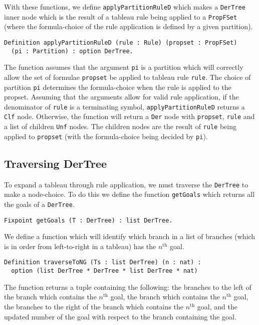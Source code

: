 \documentclass{llncs}
\newcommand{\comment}[1]{}
\begin{document}
With these functions, we define \verb+applyPartitionRuleD+ which makes a
\verb+DerTree+ inner node which is the result of a tableau rule being applied
to a \verb+PropFSet+ (where the formula-choice of the rule application is
defined by a given partition).
%
\comment{
\begin{verbatim}
Definition applyPartitionRuleD (rule : Rule) (propset : PropFSet)
  (pi : Partition) : option DerTree :=
    let inst := applyPartition (getNumerator rule) pi in
    let X := removeMultSet inst propset in
    match pi with
    | nil => None
    | _ => match (getDenominator rule) with
           | inr res => Some Clf
           | res     => derTreeAppend rule propset
                          (tableauAppend X (denoApply pi res)) nil
           end
    end.
\end{verbatim}
}
\begin{verbatim}
Definition applyPartitionRuleD (rule : Rule) (propset : PropFSet)
  (pi : Partition) : option DerTree.
\end{verbatim}
%
The function assumes that the argument \verb+pi+ is a partition which will
correctly allow the set of formulae \verb+propset+ be applied to tableau rule
\verb+rule+. The choice of partition \verb+pi+ determines the formula-choice
when the rule is applied to the propset. Assuming that the arguments allow for
valid rule application, if the denominator of \verb+rule+ is a terminating
symbol, \verb+applyPartitionRuleD+ returns a \verb+Clf+ node. Otherwise, the
function will return a \verb+Der+ node with \verb+propset+, \verb+rule+ and a
list of children \verb+Unf+ nodes. The children nodes are the result of
\verb+rule+ being applied to \verb+propset+ (with the formula-choice being
decided by \verb+pi+).
%
\subsection{Traversing DerTree}
%
To expand a tableau through rule application, we must traverse the
\verb+DerTree+ to make a node-choice. To do this we define the function
\verb+getGoals+ which returns all the goals of a \verb+DerTree+.
%
\begin{verbatim}
Fixpoint getGoals (T : DerTree) : list DerTree.
\end{verbatim}
%
We define a function which will identify which branch in a list of branches
(which is in order from left-to-right in a tableau) has the $n^{\textrm{th}}$
goal.
%
\begin{verbatim}
Definition traverseToNG (Ts : list DerTree) (n : nat) :
  option (list DerTree * DerTree * list DerTree * nat)
\end{verbatim}
%
The function returns a tuple containing the following: the branches to the left
of the branch which contains the $n^{\textrm{th}}$ goal, the branch which
contains the $n^{\textrm{th}}$ goal, the branches to the right of the branch
which contains the $n^{\textrm{th}}$ goal, and the updated number of the goal
with respect to the branch containing the goal.
\end{document}
